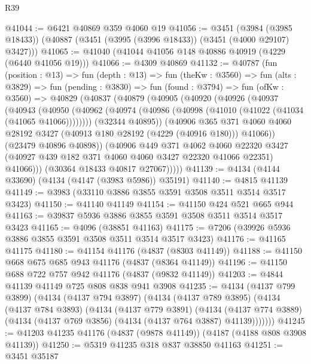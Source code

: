 \begin{lexlean}{R39}
\begin{coremodule}
@41044 := @6421 @40869 @359 @4060 @19
@41056 := @3451
    (@3984 (@3985 @18433))
    (@40887 (@3451 (@3995 (@3996 @18433)) (@3451 (@4000 @29107) @3427)))
@41065 := @41040 (@41044 @41056 @148 @40886 @40919 (@4229 (@6440 @41056 @19)))
@41066 := @4309 @40869
@41132 := @40787
    (fun (position : @13) =>
    fun (depth : @13) =>
    fun (theKw : @3560) =>
    fun (alts : @3829) =>
    fun (pending : @3830) =>
    fun (found : @3794) =>
    fun (ofKw : @3560) =>
    @40829
      (@40837
        (@40879
          (@40905
            (@40920
              (@40926
                (@40937
                  (@40943
                    (@40950
                      (@40962 (@40974 (@40986 (@40998 (@41010 (@41022 (@41034 (@41065 @41066))))))))
                      (@32344 @40895))
                    (@40906
                      @365
                      @371
                      @4060
                      @4060
                      @28192
                      @3427
                      (@40913 @180 @28192 (@4229 (@40916 @180)))
                      @41066))
                  (@23479 @40896 @40898))
                (@40906
                  @449
                  @371
                  @4062
                  @4060
                  @22320
                  @3427
                  (@40927 @439 @182 @371 @4060 @4060 @3427 @22320 @41066 @22351)
                  @41066)))
            (@30364 @18433 @40817 @27067)))))
@41139 := @4134 (@4144 @33690) (@4134 (@4147 (@3983 @5986)) @35191)
@41140 := @4815 @41139
@41149 := @3983 (@33110 @3886 @3855 @3591 @3508 @3511 @3514 @3517 @3423)
@41150 := @41140 @41149
@41154 := @41150 @424 @521 @665 @944
@41163 := @39837 @5936 @3886 @3855 @3591 @3508 @3511 @3514 @3517 @3423
@41165 := @4096 (@38851 @41163)
@41175 := @7206 (@39926 @5936 @3886 @3855 @3591 @3508 @3511 @3514 @3517 @3423)
@41176 := @41165 @41175
@41180 := @41154 @41176 (@4837 (@8303 @41149))
@41188 := @41150 @668 @675 @685 @943 @41176 (@4837 (@8364 @41149))
@41196 := @41150 @688 @722 @757 @942 @41176 (@4837 (@9832 @41149))
@41203 := @4844 @41139 @41149 @725 @808 @838 @941 @3908
@41235 := @4134
    (@4137 @799 @3899)
    (@4134
      (@4137 @794 @3897)
      (@4134
        (@4137 @789 @3895)
        (@4134
          (@4137 @784 @3893)
          (@4134
            (@4137 @779 @3891)
            (@4134
              (@4137 @774 @3889)
              (@4134 (@4137 @769 @3856) (@4134 (@4137 @764 @3887) @41139)))))))
@41245 := @41203 @41235 @41176 (@4837 (@9878 @41149)) (@4187 (@4188 @808 @3908 @41139))
@41250 := @5319 @41235 @318 @837 @38850 @41163
@41251 := @3451 @35187

\end{coremodule}
\end{lexlean}
